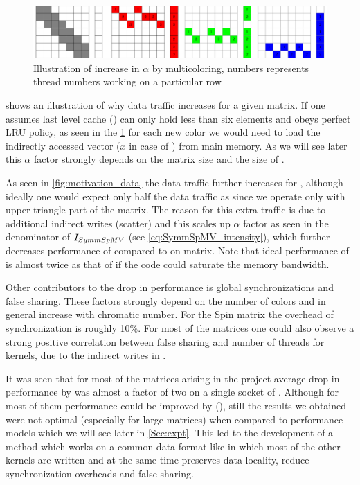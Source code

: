   \begin{figure}[htbp]
  	\centering
  	\includegraphics[scale=0.45]{pics/mc_alpha_problem/mc_alpha}
  	\caption{Illustration of increase in $\alpha$ by multicoloring, numbers represents thread numbers working on a particular row}
  	\label{fig:mc_alpha}
  \end{figure}
  
    shows an illustration of why data traffic increases for a given matrix. If one assumes last level cache (\LLC) can only hold less than six elements and obeys perfect LRU policy, as seen in the \cref{fig:mc_alpha} for  each new color we would need to load the indirectly accessed vector ($x$ in case of \SpMV) from main memory. As we will see later this $\alpha$ factor strongly depends on the matrix size and the size of \LLC.
  
 As seen in \cref{fig:motivation_data} the data traffic further increases for \SymmSpmv, although ideally one would expect only half the data traffic as \SpMV since we operate only with upper triangle part of the matrix. The reason for this extra traffic is due to additional indirect writes (scatter) and this scales up $\alpha$ factor as seen in the denominator of $I_{SymmSpMV}$ (see \cref{eq:SymmSpMV_intensity}),  which further decreases performance of \SymmSpmv compared to \SpMV on \MC matrix. Note that ideal performance of \SymmSpmv is almost twice as that of \SpMV if the code could saturate the memory bandwidth.
 
 Other contributors to the drop in performance is global synchronizations and false sharing. These factors strongly depend on the number of colors and in general increase with chromatic number. For the Spin matrix the overhead of synchronization is roughly 10\%.  For most of the matrices one could also observe a strong positive correlation between false sharing and number of threads for \SymmSpmv kernels, due to the indirect writes in \SymmSpmv.

It was seen that for most of the matrices arising in the project average drop in performance by \MCfull was almost a factor of two on a single socket of \IVB. Although for most of them performance could be improved by \ABMCfull (\ABMC), still the results we obtained were not optimal (especially for large matrices) when compared to performance models which we will see later in \cref{Sec:expt}. This led to the development of a method which works on a common data format like \CRS in which most of the other kernels are written and at the same time preserves data locality, reduce synchronization overheads and false sharing.
 

